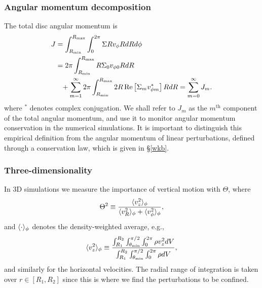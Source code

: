 \subsubsection{Angular momentum decomposition}
The total disc angular momentum is
\begin{align}
  J &= \int_{R_\mathrm{min}}^{R_\mathrm{max}}\int_0^{2\pi} \Sigma Rv_\phi RdRd\phi \notag\\
  &= 2\pi\int_{R_\mathrm{min}}^{R_\mathrm{max}} R\Sigma_0 v_{\phi0} R dR \notag\\ 
  &\phantom{=}+
  \sum_{m=1}^\infty2\pi\int_{R_\mathrm{min}}^{R_\mathrm{max}} 2R\operatorname{Re}\left[\Sigma_m v_{\phi
      m}^*\right] RdR 
  = \sum_{m=0}^\infty J_m. 
\end{align}
where $^*$ denotes complex conjugation. We shall refer to $J_m$ as the
$m^\mathrm{th}$ component of the total angular momentum, and use it to
monitor angular momentum conservation in the numerical simulations. 
It is important to distinguish this empirical definition from the
angular momentum of linear perturbations, defined through a
conservation law, which is given in \S\ref{wkb}. 


\subsubsection{Three-dimensionality}
In 3D simulations we measure the importance of vertical motion with
$\Theta$, where 
\begin{align}\label{theta}
  \Theta^2 \equiv \frac{\langle v_z^2 \rangle_\phi}{\langle v_R^2 \rangle_\phi+\langle v_\phi^2 \rangle_\phi}, 
\end{align}
and $\langle \cdot \rangle_\phi$ denotes the density-weighted average, e.g., 
\begin{align}
  \langle v_z^2 \rangle_\phi \equiv\frac{
    \int_{R_1}^{R_2}\int_{\theta_\mathrm{min}}^{\pi/2} \int_{0}^{2\pi}
    \rho v_z^2 dV}{
    \int_{R_1}^{R_2}\int_{\theta_\mathrm{min}}^{\pi/2} \int_{0}^{2\pi}
    \rho dV
  },
\end{align}
and similarly for the horizontal velocities. The radial range of
integration is taken over $r\in[R_1,R_2]$ since this is where
we find the perturbations to be confined. 

